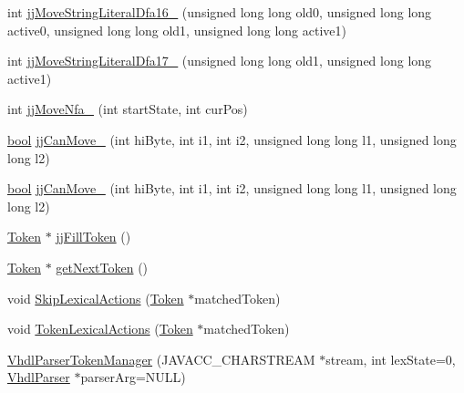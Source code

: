 \begin{DoxyCompactItemize}
\item 
int \hyperlink{classvhdl_1_1parser_1_1_vhdl_parser_token_manager_a7af5b162ba41b1264321a9d73d97202b}{jj\+Move\+String\+Literal\+Dfa16\+\_} (unsigned long long old0, unsigned long long active0, unsigned long long old1, unsigned long long active1)
\item 
int \hyperlink{classvhdl_1_1parser_1_1_vhdl_parser_token_manager_a6c92458e2f60d576206c0dd274ac629d}{jj\+Move\+String\+Literal\+Dfa17\+\_} (unsigned long long old1, unsigned long long active1)
\item 
int \hyperlink{classvhdl_1_1parser_1_1_vhdl_parser_token_manager_a77c7cba4235a5481100599a8a94b2726}{jj\+Move\+Nfa\+\_} (int start\+State, int cur\+Pos)
\item 
\hyperlink{qglobal_8h_a1062901a7428fdd9c7f180f5e01ea056}{bool} \hyperlink{classvhdl_1_1parser_1_1_vhdl_parser_token_manager_a3f30861371198cce27c86dfae0c82504}{jj\+Can\+Move\+\_} (int hi\+Byte, int i1, int i2, unsigned long long l1, unsigned long long l2)
\item 
\hyperlink{qglobal_8h_a1062901a7428fdd9c7f180f5e01ea056}{bool} \hyperlink{classvhdl_1_1parser_1_1_vhdl_parser_token_manager_acf6f02dbe13a50624c0463a57cc37700}{jj\+Can\+Move\+\_} (int hi\+Byte, int i1, int i2, unsigned long long l1, unsigned long long l2)
\item 
\hyperlink{classvhdl_1_1parser_1_1_token}{Token} $\ast$ \hyperlink{classvhdl_1_1parser_1_1_vhdl_parser_token_manager_a575e793ba868b3e91ee00a3fd2315073}{jj\+Fill\+Token} ()
\item 
\hyperlink{classvhdl_1_1parser_1_1_token}{Token} $\ast$ \hyperlink{classvhdl_1_1parser_1_1_vhdl_parser_token_manager_ac17f53300a62b7e188710e1c0bdbc1dc}{get\+Next\+Token} ()
\item 
void \hyperlink{classvhdl_1_1parser_1_1_vhdl_parser_token_manager_aaf3e9777b25cd23111cf8d3e0b52b626}{Skip\+Lexical\+Actions} (\hyperlink{classvhdl_1_1parser_1_1_token}{Token} $\ast$matched\+Token)
\item 
void \hyperlink{classvhdl_1_1parser_1_1_vhdl_parser_token_manager_a01b77f27be99993282299ea5556ee36e}{Token\+Lexical\+Actions} (\hyperlink{classvhdl_1_1parser_1_1_token}{Token} $\ast$matched\+Token)
\item 
\hyperlink{classvhdl_1_1parser_1_1_vhdl_parser_token_manager_ae4dadde3df1ebd8e99399d60716633f9}{Vhdl\+Parser\+Token\+Manager} (J\+A\+V\+A\+C\+C\+\_\+\+C\+H\+A\+R\+S\+T\+R\+E\+A\+M $\ast$stream, int lex\+State=0, \hyperlink{classvhdl_1_1parser_1_1_vhdl_parser}{Vhdl\+Parser} $\ast$parser\+Arg=N\+U\+L\+L)

\end{DoxyCompactItemize}
